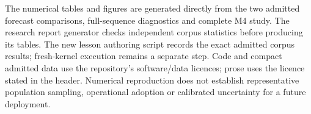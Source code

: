 \documentclass[11pt,a4paper]{article}
\begin{document}
The numerical tables and figures are generated directly from the two admitted forecast comparisons, full-sequence diagnostics and complete M4 study. The research report generator checks independent corpus statistics before producing its tables. The new lesson authoring script records the exact admitted corpus results; fresh-kernel execution remains a separate step. Code and compact admitted data use the repository's software/data licences; prose uses the licence stated in the header. Numerical reproduction does not establish representative population sampling, operational adoption or calibrated uncertainty for a future deployment.





\appendix

\end{document}
